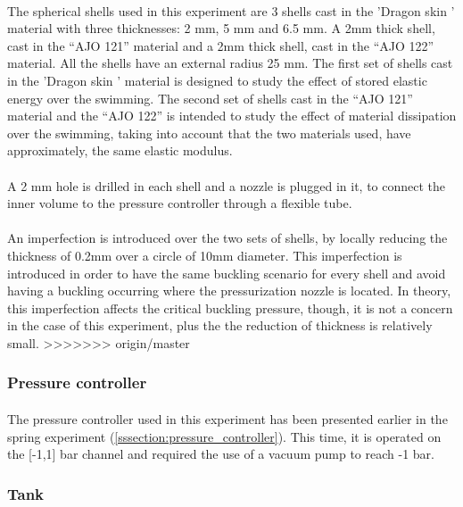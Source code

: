 \paragraph{}
The spherical shells used in this experiment are 3 shells cast in the 'Dragon skin ' material with three thicknesses: 2 mm, 5 mm and 6.5 mm. A 2mm thick shell, cast in the "`AJO 121"' material and a 2mm thick shell, cast in the "`AJO 122"' material. All the shells have an external radius 25 mm. 
The first set of shells cast in the 'Dragon skin ' material is designed to study the effect of stored elastic energy over the swimming.
The second set of shells cast in the "`AJO 121"' material and the "`AJO 122"' is intended to study the effect of material dissipation over the swimming, taking into account that the two materials used, have approximately, the same elastic modulus.
\paragraph{}
A 2 mm hole is drilled in each shell and a nozzle is plugged in it, to connect the inner volume to the pressure controller through a flexible tube.
\paragraph{}
An imperfection is introduced over the two sets of shells, by locally reducing the thickness of 0.2mm over a circle of 10mm diameter. This imperfection is introduced in order to have the same buckling scenario for every shell and avoid having a buckling occurring where the pressurization nozzle is located.
In theory, this imperfection affects the critical buckling pressure\cite{Preis}, though, it is not a concern in the case of this experiment, plus the the reduction of thickness is relatively small.
>>>>>>> origin/master
\subsubsection{Pressure controller}
\paragraph{}
The pressure controller used in this experiment has been presented earlier in the spring experiment (\ref{sssection:pressure_controller}). This time, it is operated on the [-1,1] bar channel and required the use of a vacuum pump to reach -1 bar.
\subsubsection{Tank}
